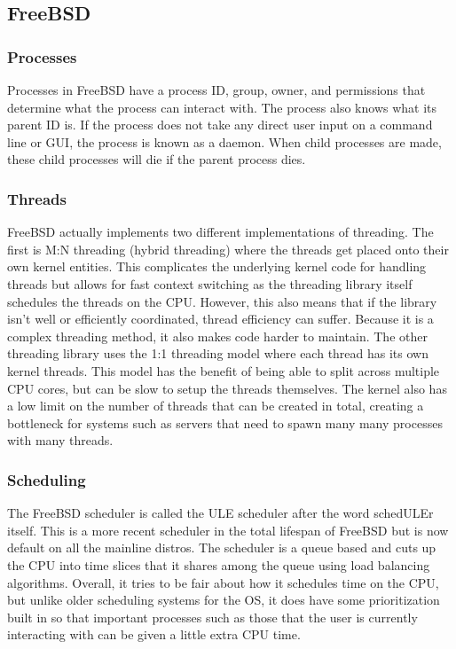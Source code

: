 \subsection{FreeBSD}
\subsubsection{Processes}
Processes in FreeBSD have a process ID, group, owner, and permissions that determine what the process can interact with. The process also knows what its parent ID is. If the process does not take any direct user input on a command line or GUI, the process is known as a daemon. When child processes are made, these child processes will die if the parent process dies. 
\subsubsection{Threads}
FreeBSD actually implements two different implementations of threading. The first is M:N threading (hybrid threading) where the threads get placed onto their own kernel entities. This complicates the underlying kernel code for handling threads but allows for fast context switching as the threading library itself schedules the threads on the CPU. However, this also means that if the library isn't well or efficiently coordinated, thread efficiency can suffer. Because it is a complex threading method, it also makes code harder to maintain.
The other threading library uses the 1:1 threading model where each thread has its own kernel threads. This model has the benefit of being able to split across multiple CPU cores, but can be slow to setup the threads themselves. The kernel also has a low limit on the number of threads that can be created in total, creating a bottleneck for systems such as servers that need to spawn many many processes with many threads. 
\subsubsection{Scheduling}

The FreeBSD scheduler is called the ULE scheduler after the word schedULEr itself. This is a more recent scheduler in the total lifespan of FreeBSD but is now default on all the mainline distros. The scheduler is a queue based and cuts up the CPU into time slices that it shares among the queue using load balancing algorithms. Overall, it tries to be fair about how it schedules time on the CPU, but unlike older scheduling systems for the OS, it does have some prioritization built in so that important processes such as those that the user is currently interacting with can be given a little extra CPU time.

